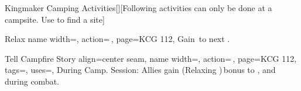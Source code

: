 \begin{PageFrontLandscape}
\begin{TablesHalf}{\frontTableHeight}
\begin{Table}{Kingmaker Camping Activities}[][Following activities can only be done at a campsite. Use
         to find a site]
            \begin{entry}{Relax}{%
                name width=\activityLength,%
                action=\,,
                page=KCG 112,
            }
                Gain \,\Cirm to next .
            \end{entry}
            \begin{entry}{Tell Campfire Story}{%
                align=center seam,
                name width=\activityLength,%
                action=\,,
                page=KCG 112,
                tags=\Concentrate, %
                uses=\Performance,
            }
                During Camp. Session: Allies gain (Relaxing )\,\Status bonus to ,  and  during combat.\\
                 \hfill{}\hfill
            \end{entry}
        \end{Table}
    \end{TablesHalf}%
\end{PageFrontLandscape}